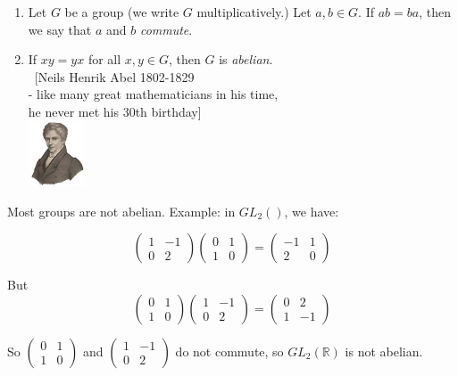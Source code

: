 \documentclass[twoside]{scrartcl}
\begin{document}
\begin{definition}\begin{enumerate}
 \item Let $G$ be a group (we write $G$ multiplicatively.) Let $a,b \in G$. If $ab = ba$, then we say that $a$ and $b$ \emph{commute}. 
 \item 

 If $xy = yx$ for all $x,y \in G$, then $G$ is \emph{abelian}.\\ ~[Neils Henrik Abel 1802-1829\\ - like many great mathematicians in his time,\\ he never met his 30th birthday]  \\[-2cm] \vspace*{-50pt} \hspace*{260pt} \includegraphics[width=0.13\textwidth]{abel.jpg}
 \end{enumerate}
 \vspace*{50pt}
  \end{definition}

  Most groups are not abelian. Example: in $GL_2()$, we have:

\[\begin{pmatrix}
1 & -1 \\ 0 & 2
\end{pmatrix}
\begin{pmatrix}
0 & 1 \\ 1 & 0
\end{pmatrix}
= 
\begin{pmatrix}
-1 & 1\\ 2 & 0
\end{pmatrix}\]

But 
\[
\begin{pmatrix}
0 & 1 \\ 1 & 0
\end{pmatrix}
\begin{pmatrix}
1 & -1 \\ 0 & 2
\end{pmatrix}
=
\begin{pmatrix}
0 & 2 \\ 1 & -1
\end{pmatrix}\]

So $\left(\begin{smallmatrix}
0 & 1\\ 1 & 0
\end{smallmatrix}\right)
$ and $\left(\begin{smallmatrix}
1 & -1\\ 0 & 2
\end{smallmatrix}\right)
$ do not commute, so $GL_2(\mathbb{R})$ is not abelian.\\
\end{document}

